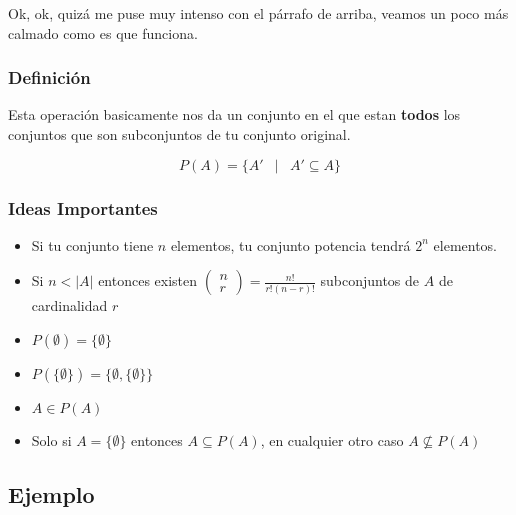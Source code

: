 \documentclass[12pt]{report}                                    %
\DeclareMathOperator \Space {\quad}                             %
\DeclareMathOperator \MiniSpace {\;}                            %
\newcommand \Such {\MiniSpace|\MiniSpace}                       %
\newcommand{\pVector}[1]{                                       %
        \ensuremath{\begin{pmatrix}#1\end{pmatrix}}                 %
    }
\begin{document}
                Ok, ok, quizá me puse muy intenso con el párrafo de arriba, veamos un poco más calmado
                como es que funciona.

                \subsubsection*{Definición}

                    Esta operación basicamente nos da un conjunto en el que estan \textbf{todos} los
                    conjuntos que son subconjuntos de tu conjunto original.

                    \begin{equation}
                        P(A) = \{ A' \Such A' \subseteq A \}
                    \end{equation}

                \subsubsection*{Ideas Importantes}

                \begin{itemize}
                    \item Si tu conjunto tiene $n$ elementos, tu conjunto potencia tendrá $2^n$ elementos.

                    \item Si $n < |A|$ entonces existen $\pVector{n\\r} = \frac{n!}{r!(n-r)!}$ subconjuntos
                            de $A$ de cardinalidad $r$

                    \item $P(\emptyset) = \{\emptyset\}$

                    \item $P( \{\emptyset\}) = \{\emptyset, \{\emptyset\} \}$

                    \item $A \in P(A)$
                    \item Solo si $A = \{\emptyset\}$ entonces $A \subseteq P(A)$,
                    en cualquier otro caso $A \nsubseteq P(A)$
                \end{itemize}

                \clearpage
                \subsection*{Ejemplo}
\end{document}
